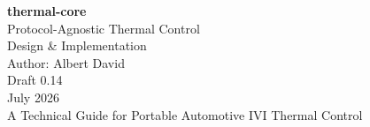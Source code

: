 \documentclass[11pt,a4paper]{article}
\begin{document}
\thispagestyle{fancy}

\vspace*{3cm}

\begin{center}
    {\huge\bfseries thermal-core}\\[1ex]
    {\Large Protocol-Agnostic Thermal Control}\\[0.5ex]
    {\Large Design \& Implementation}\\[2ex]
    {\large Author: Albert David}\\[2ex]
    {\large Draft 0.14}\\[1ex]
    July 2026\\[2ex]
    {\normalsize A Technical Guide for Portable Automotive IVI Thermal Control}
\end{center}
\vspace{2em}
\end{document}
